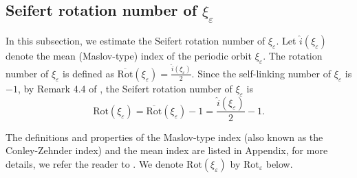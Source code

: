 \documentclass[11pt]{amsart}
\newcommand{\ep}{\varepsilon}
\begin{document}
\subsection{Seifert rotation number of $\xi_{\ep}$} 
In this subsection, we estimate the Seifert rotation number of  $\xi_{\ep}$. Let $\hat{i}(\xi_{\ep})$ denote the mean (Maslov-type) index of the periodic orbit $\xi_{\ep}$. The rotation number of $\xi_{\ep}$ is defined as  
	$
	\overline{\text{Rot}}(\xi_{\ep}) = \frac{\hat{i}(\xi_{\ep})}{2}.  
	$  
Since the self-linking number of $\xi_{\ep}$ is $-1$, by Remark 4.4 of \cite{CHHL23}, the Seifert rotation number of $\xi_{\ep}$ is  
\begin{equation}\label{eq;rot_ep}
	\text{Rot}(\xi_{\ep})=\overline{\text{Rot}}(\xi_{\ep})-1=\frac{\hat{i}(\xi_{\ep})}{2}-1.
\end{equation} 

The definitions and properties of the Maslov-type index (also known as the Conley-Zehnder index) and the mean index are listed in Appendix, for more details, we refer the reader to \cite{Lon02}. We denote $\text{Rot}(\xi_{\ep})$ by $\text{Rot}_\ep$ below.
\end{document}
